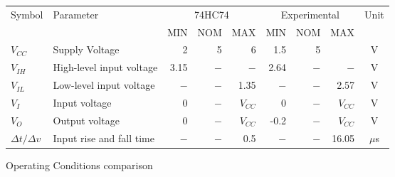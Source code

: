 \begin{tabular}{|l|l|r|r|r|r|r|r|c|}
    \toprule
    Symbol  &Parameter  &\multicolumn{3}{|c|}{74HC74}&\multicolumn{3}{|c|}{Experimental}&Unit\\
            &           &   MIN&NOM&MAX&MIN&NOM&MAX&\\
    \midrule
    $V_{CC}$&Supply Voltage&2&5&6&1.5&5&  &V\\
    $V_{IH}$&High-level input voltage&3.15&$-$&$-$&2.64&$-$&$-$&V\\
    $V_{IL}$&Low-level input voltage&$-$&$-$&1.35&$-$&$-$&2.57&V\\
    $V_{I}$ &Input voltage&0&$-$&$V_{CC}$&0&$-$&$V_{CC}$&V\\
    $V_{O}$ &Output voltage&0&$-$&$V_{CC}$&-0.2&$-$&$V_{CC}$&V\\
    $\Delta t / \Delta v$&  Input rise and fall time&$-$&$-$&0.5&$-$&$-$&16.05&$\mu$s\\
    \bottomrule
\end{tabular}
\caption{Operating Conditions comparison}